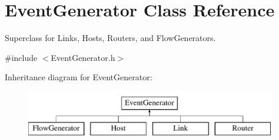 \hypertarget{classEventGenerator}{\section{\-Event\-Generator \-Class \-Reference}
\label{classEventGenerator}
}


\-Superclass for \-Links, \-Hosts, \-Routers, and \-Flow\-Generators.  




{\ttfamily \#include $<$\-Event\-Generator.\-h$>$}

\-Inheritance diagram for \-Event\-Generator\-:\begin{figure}[H]
\begin{center}
\leavevmode
\includegraphics[height=2.000000cm]{classEventGenerator}
\end{center}
\end{figure}
